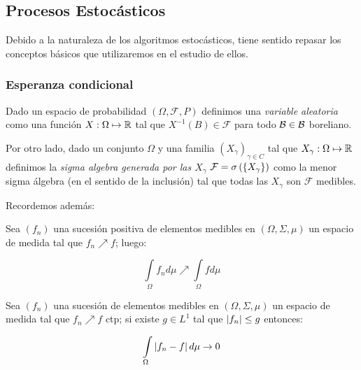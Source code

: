 \subsection{Procesos Estoc\'asticos}

Debido a la naturaleza de los algoritmos estoc\'asticos, tiene sentido repasar los conceptos b\'asicos que utilizaremos en el estudio de ellos.

\subsubsection{Esperanza condicional}

Dado un espacio de probabilidad $\left(\Omega, \mathcal{F}, P\right)$ definimos una \textit{variable aleatoria } como una funci\'on $X : \Omega \mapsto {\mathbb{R}}$ tal que $X^{-1}(B) \in \mathcal{F}$ para todo $\mathcal{B} \in \mathcal{B}$ boreliano.

Por otro lado, dado un conjunto $\Omega$ y una familia $\left(X_{\gamma}\right)_{\gamma \in C}$ tal que $X_{\gamma}: \Omega \mapsto {\mathbb{R}}$ definimos la \textit{sigma algebra generada por las $X_\gamma$} $\mathcal{F} = \sigma\left(\left\lbrace X_{\gamma}\right\rbrace\right)$ como la menor sigma \'algebra (en el sentido de la inclusi\'on) tal que todas las $X_{\gamma}$ son $\mathcal{F}$ medibles.

Recordemos adem\'as:

\begin{theorem}
	\label{theorem: Convergencia monotona}
	Sea $(f_n)$ una sucesi\'on positiva de elementos medibles en $(\Omega, \Sigma, \mu)$ un espacio de medida tal que $f_n \nearrow f$; luego:
	
	\begin{equation*}
		\int\limits_{\Omega} {f_n d\mu} \nearrow \int\limits_{\Omega}{f d\mu} 
	\end{equation*} 
\end{theorem}

\begin{theorem}
	\label{theorem: Convergencia dominada}
	Sea $(f_n)$ una sucesi\'on de elementos medibles en $(\Omega, \Sigma, \mu)$ un espacio de medida tal que $f_n \nearrow f$ ctp; si existe $g \in L^1$ tal que $\left\lvert f_n\right\rvert \leq g$ entonces:
	
	\begin{equation*}
	\int\limits_{\Omega} {\left\lvert f_n -f\right\rvert d\mu} \rightarrow 0
	\end{equation*} 
\end{theorem}


